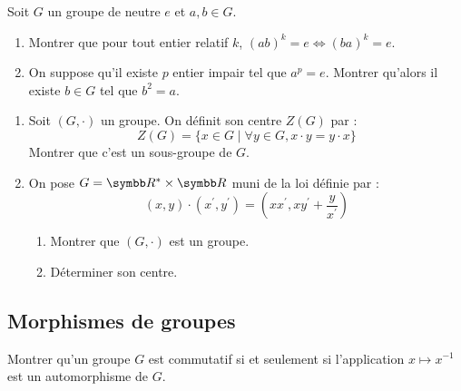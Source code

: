 \begin{exercice}
    Soit $G$ un groupe de neutre $e$ et $a,b\in G$.
    \begin{enumerate}
        \item Montrer que pour tout entier relatif $k$, $(ab)^{k}=e\iff(ba)^{k}=e$.
        \item On suppose qu'il existe $p$ entier impair tel que $a^{p}=e$. Montrer qu'alors il existe $b\in G$ tel que $b^{2}=a$.
    \end{enumerate}
\end{exercice}

\begin{exercice}
\begin{enumerate}
    \item Soit $(G,\cdot)$ un groupe. On définit son centre $Z(G)$ par :
        \[Z(G)=\{x\in G \mid \forall y\in G, x \cdot y=y \cdot x\}\]
        Montrer que c'est un sous-groupe de $G$.
    \item On pose $G=\R^{*}\times\R$ muni de la loi définie par :
        \[(x,y) \cdot (x^{\prime},y^{\prime})=\left(xx^{\prime},xy^{\prime}+\frac{y}{x^{\prime}}\right)\]
        \begin{enumerate}
            \item Montrer que $(G,\cdot)$ est un groupe.
            \item Déterminer son centre.
        \end{enumerate}
\end{enumerate}
\end{exercice}

\subsection{Morphismes de groupes}
\begin{exercice}
    Montrer qu'un groupe $G$ est commutatif si et seulement si l'application $x\mapsto x^{-1}$ est un automorphisme de $G$.
\end{exercice}

